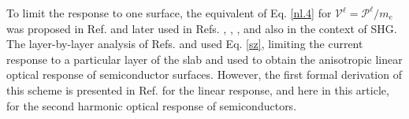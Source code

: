 To limit the response to one surface, the equivalent of Eq. \eqref{nl.4} 
for $\boldsymbol{\mathcal{V}}^\ell=\boldsymbol{\mathcal{P}}^\ell/m_{e}$ was proposed in 
Ref. \cite{reiningPRB94} and later used in Refs.
\cite{mendozaPRL98},
\cite{mendozaPRB01},
\cite{sanoPRB02},
 and \cite{mejiaRMF04} 
also in the context of SHG. 
The layer-by-layer analysis of Refs. \cite{hoganPRB03} 
and \cite{castilloPRB03} used Eq. \eqref{sz}, 
limiting the current response
to a particular layer of the slab and used to obtain the
anisotropic linear optical response of semiconductor surfaces.
However, the first formal derivation of this scheme is presented in
Ref. \cite{mendozaPRB06} for the linear response, and here in this 
article, for the second harmonic optical response of semiconductors.



